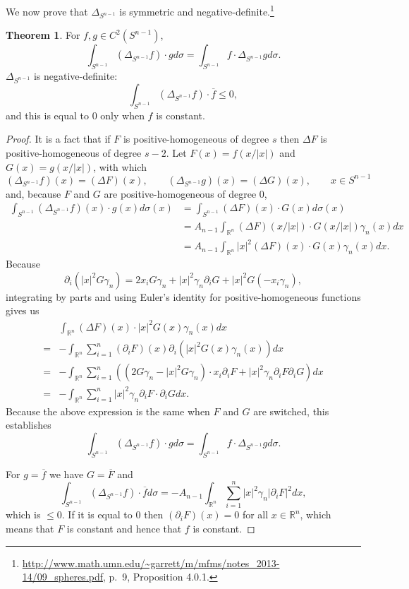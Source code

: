 \documentclass{article}
\theoremstyle{definition}
\newtheorem{theorem}{Theorem}
\theoremstyle{definition}
\begin{document}
We now prove that $\Delta_{S^{n-1}}$ is symmetric and negative-definite.\footnote{\url{http://www.math.umn.edu/~garrett/m/mfms/notes_2013-14/09_spheres.pdf},
p.~9, Proposition 4.0.1.}

\begin{theorem}
For $f,g \in C^2(S^{n-1})$,
\[
\int_{S^{n-1}} (\Delta_{S^{n-1}} f) \cdot g d\sigma
=\int_{S^{n-1}} f \cdot \Delta_{S^{n-1}} g d\sigma.
\]
$\Delta_{S^{n-1}}$ is negative-definite:
\[
\int_{S^{n-1}} (\Delta_{S^{n-1}} f) \cdot \overline{f} \leq 0,
\]
and this is equal to $0$ only when $f$ is constant.
\end{theorem}
\begin{proof}
It is a fact that if $F$ is positive-homogeneous of degree $s$ then $\Delta F$ is positive-homogeneous of degree $s-2$. 
Let $F(x)=f(x/|x|)$ and $G(x)=g(x/|x|)$, with which
\[
(\Delta_{S^{n-1}} f)(x) = (\Delta F)(x),\qquad
(\Delta_{S^{n-1}} g)(x) = (\Delta G)(x),\qquad x \in S^{n-1}
\]
and, because $F$ and $G$ are positive-homogeneous of degree $0$,
\begin{align*}
\int_{S^{n-1}} (\Delta_{S^{n-1}} f)(x) \cdot g(x)d\sigma(x)&=\int_{S^{n-1}} (\Delta F)(x) \cdot G(x) d\sigma(x)\\
&=A_{n-1} \int_{\mathbb{R}^n} 
(\Delta F)(x/|x|) \cdot G(x/|x|) \gamma_n(x) dx\\
&=A_{n-1} \int_{\mathbb{R}^n} |x|^2 (\Delta F)(x) \cdot G(x) \gamma_n(x) dx.
\end{align*}
Because
\[
\partial_i(|x|^2 G \gamma_n) 
=2x_i G\gamma_n + |x|^2 \gamma_n \partial_i G +|x|^2 G (-x_i \gamma_n),
\]
integrating by parts and using 
Euler's identity for positive-homogeneous functions gives us
\[
\begin{split}
&\int_{\mathbb{R}^n}(\Delta F)(x) \cdot  |x|^2 G(x) \gamma_n(x) dx\\
=&-\int_{\mathbb{R}^n} \sum_{i=1}^n (\partial_i F)(x) \partial_i( |x|^2 G(x) \gamma_n(x)) dx\\
=&-\int_{\mathbb{R}^n} \sum_{i=1}^n ((2G\gamma_n-|x|^2 G\gamma_n) \cdot x_i \partial_i F
+|x|^2 \gamma_n \partial_i F \partial_i G) dx\\
=&-\int_{\mathbb{R}^n} \sum_{i=1}^n |x|^2 \gamma_n \partial_i F \cdot \partial_i G dx.
\end{split}
\]
Because the above expression is the same when $F$ and $G$ are switched, this establishes 
\[
\int_{S^{n-1}} (\Delta_{S^{n-1}} f) \cdot g d\sigma
=\int_{S^{n-1}} f \cdot \Delta_{S^{n-1}} g d\sigma.
\]

For $g = \overline{f}$ we have $G=\overline{F}$ and 
\[
\int_{S^{n-1}} (\Delta_{S^{n-1}} f) \cdot \overline{f} d\sigma
=-A_{n-1} \int_{\mathbb{R}^n} \sum_{i=1}^n |x|^2 \gamma_n |\partial_i F|^2 dx,
\]
which is $\leq 0$. If it is equal to $0$ then $(\partial_i F)(x)=0$ for all $x \in \mathbb{R}^n$, 
which means that $F$ is constant and hence that $f$ is constant.
\end{proof}
\end{document}
